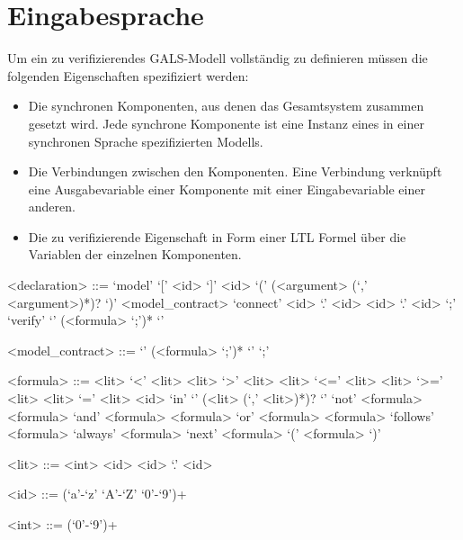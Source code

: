 \section{Eingabesprache}
Um ein zu verifizierendes GALS-Modell vollständig zu definieren müssen die folgenden Eigenschaften spezifiziert werden:
\begin{itemize}
\item Die synchronen Komponenten, aus denen das Gesamtsystem zusammen gesetzt wird.
  Jede synchrone Komponente ist eine Instanz eines in einer synchronen Sprache spezifizierten Modells.
\item Die Verbindungen zwischen den Komponenten.
  Eine Verbindung verknüpft eine Ausgabevariable einer Komponente mit einer Eingabevariable einer anderen.
\item Die zu verifizierende Eigenschaft in Form einer LTL Formel über die Variablen der einzelnen Komponenten.
\end{itemize}

\begin{grammar}
  <declaration> ::= `model' `[' <id> `]' <id> `(' (<argument> (`,' <argument>)*)? `)' <model_contract>
  \alt `connect' <id> `.' <id> <id> `.' <id> `;'
  \alt `verify' `{' (<formula> `;')* `}'

  <model_contract> ::= `{' (<formula> `;')* `}'
  \alt `;'

  <formula> ::= <lit> `<' <lit>
  \alt <lit> `>' <lit>
  \alt <lit> `<=' <lit>
  \alt <lit> `>=' <lit>
  \alt <lit> `=' <lit>
  \alt <id> `in' `{' (<lit> (`,' <lit>)*)? `}'
  \alt `not' <formula>
  \alt <formula> `and' <formula>
  \alt <formula> `or' <formula>
  \alt <formula> `follows' <formula>
  \alt `always' <formula>
  \alt `next' <formula>
  \alt `(' <formula> `)'

  <lit> ::= <int>
  \alt <id>
  \alt <id> `.' <id>
  
  <id> ::= (`a'-`z' `A'-`Z' `0'-`9')+

  <int> ::= (`0'-`9')+
\end{grammar}



